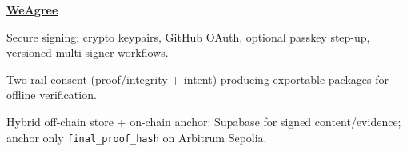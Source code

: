 \begin{twocolentry}{}
\href{https://github.com/faketut/WeAgree}{\textbf{WeAgree}}
\end{twocolentry}
\begin{onecolentry}
\begin{highlights}
\item Secure signing: crypto keypairs, GitHub OAuth, optional passkey step-up, versioned multi-signer workflows.
\item Two-rail consent (proof/integrity + intent) producing exportable packages for offline verification.
\item Hybrid off-chain store + on-chain anchor: Supabase for signed content/evidence; anchor only \texttt{final\_proof\_hash} on Arbitrum Sepolia.
\end{highlights}
\end{onecolentry}
